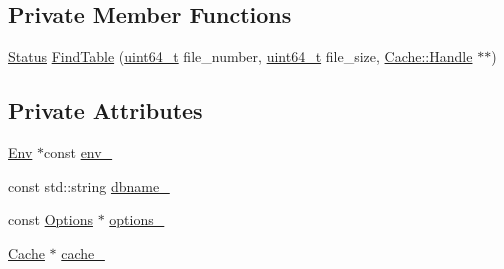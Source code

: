 \subsection*{Private Member Functions}
\begin{DoxyCompactItemize}
\item 
\hyperlink{classleveldb_1_1_status}{Status} \hyperlink{classleveldb_1_1_table_cache_a7bdef9bd0719fb33021e5a638b979309}{Find\-Table} (\hyperlink{stdint_8h_aaa5d1cd013383c889537491c3cfd9aad}{uint64\-\_\-t} file\-\_\-number, \hyperlink{stdint_8h_aaa5d1cd013383c889537491c3cfd9aad}{uint64\-\_\-t} file\-\_\-size, \hyperlink{structleveldb_1_1_cache_1_1_handle}{Cache\-::\-Handle} $\ast$$\ast$)
\end{DoxyCompactItemize}
\subsection*{Private Attributes}
\begin{DoxyCompactItemize}
\item 
\hyperlink{classleveldb_1_1_env}{Env} $\ast$const \hyperlink{classleveldb_1_1_table_cache_af5d435597adb6dccac9bd05958f24afb}{env\-\_\-}
\item 
const std\-::string \hyperlink{classleveldb_1_1_table_cache_adce6e6a7cfbf8822e5035ca44306c77b}{dbname\-\_\-}
\item 
const \hyperlink{structleveldb_1_1_options}{Options} $\ast$ \hyperlink{classleveldb_1_1_table_cache_ad24157b076d23fc18fe90d530241fd23}{options\-\_\-}
\item 
\hyperlink{classleveldb_1_1_cache}{Cache} $\ast$ \hyperlink{classleveldb_1_1_table_cache_a27afd704a6aa631d57c684e0b8c548c6}{cache\-\_\-}
\end{DoxyCompactItemize}


